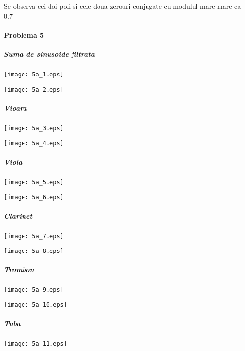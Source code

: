 \documentclass[12pt,english]{article}
\begin{document}
Se observa cei doi poli si cele doua zerouri conjugate cu modulul mare mare ca 0.7

\pagebreak
\paragraph {Problema 5}

\subparagraph {Suma de sinusoide filtrata}
\begin{center}
\texttt{[image: 5a\_1.eps]}
\end{center}

\begin{center}
\texttt{[image: 5a\_2.eps]}
\end{center}
\pagebreak

\subparagraph {Vioara}
\begin{center}
\texttt{[image: 5a\_3.eps]}
\end{center}

\begin{center}
\texttt{[image: 5a\_4.eps]}
\end{center}
\pagebreak

\subparagraph {Viola}
\begin{center}
\texttt{[image: 5a\_5.eps]}
\end{center}

\begin{center}
\texttt{[image: 5a\_6.eps]}
\end{center}
\pagebreak

\subparagraph {Clarinet}
\begin{center}
\texttt{[image: 5a\_7.eps]}
\end{center}

\begin{center}
\texttt{[image: 5a\_8.eps]}
\end{center}
\pagebreak

\subparagraph {Trombon}
\begin{center}
\texttt{[image: 5a\_9.eps]}
\end{center}

\begin{center}
\texttt{[image: 5a\_10.eps]}
\end{center}
\pagebreak

\subparagraph {Tuba}
\begin{center}
\texttt{[image: 5a\_11.eps]}
\end{center}
\end{document}
